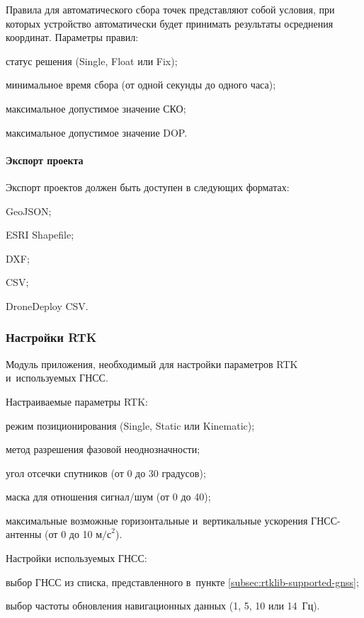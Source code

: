 Правила для автоматического сбора точек представляют собой условия, при которых устройство автоматически будет принимать результаты осреднения координат. Параметры правил:
\begin{dashitemize}
  \item статус решения (Single, Float или Fix);
  \item минимальное время сбора (от одной секунды до одного часа);
  \item максимальное допустимое значение СКО;
  \item максимальное допустимое значение DOP.
\end{dashitemize}

\paragraph{Экспорт проекта}

Экспорт проектов должен быть доступен в следующих форматах:
\begin{dashitemize}
  \item GeoJSON;
  \item ESRI Shapefile;
  \item DXF;
  \item CSV;
  \item DroneDeploy CSV.
\end{dashitemize}


\subsubsection{Настройки RTK}

Модуль приложения, необходимый для настройки параметров RTK и~используемых ГНСС.

Настраиваемые параметры RTK:
\begin{dashitemize}
  \item режим позиционирования (Single, Static или Kinematic);
  \item метод разрешения фазовой неоднозначности;
  \item угол отсечки спутников (от 0 до 30 градусов);
  \item маска для отношения сигнал/шум (от 0 до 40);
  \item максимальные возможные горизонтальные и~вертикальные ускорения ГНСС-антенны (от 0 до 10 $\text{м/с}^{2}$).
\end{dashitemize}

Настройки используемых ГНСС:
\begin{dashitemize}
  \item выбор ГНСС из списка, представленного в~пункте \ref{subsec:rtklib-supported-gnss};
  \item выбор частоты обновления навигационных данных (1, 5, 10 или 14~Гц).
\end{dashitemize}

